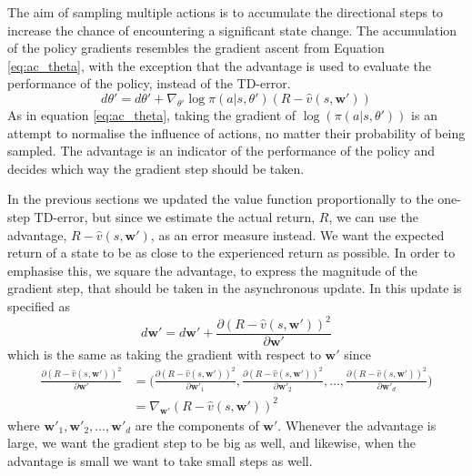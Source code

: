 \documentclass[11pt]{article}
\begin{document}
The aim of sampling multiple actions is to accumulate the directional steps
to increase the chance of encountering a significant state change.
The accumulation of the policy gradients resembles the gradient ascent from Equation
\ref{eq:ac_theta}, with the exception that the advantage is used to evaluate
the performance of the policy, instead of the TD-error.
\begin{equation}
    d\theta' = d\theta' + \nabla_{\theta'} \log \pi(a|s, \theta')(R - \hat{v}(s, \mathbf{w}'))
\end{equation}
As in equation \ref{eq:ac_theta}, taking the gradient of $\log(\pi(a|s, \theta'))$
is an attempt to normalise the influence of actions, no matter their probability
of being sampled.
The advantage is an indicator of the performance of the policy and decides
which way the gradient step should be taken.

In the previous sections we updated the value function proportionally to the
one-step TD-error, but since we estimate the actual return, $R$,
we can use the advantage, $R - \hat{v}(s, \mathbf{w'})$,
as an error measure instead.
We want the expected return of a state to be as close to the experienced return as possible.
In order to emphasise this, we square the advantage, to express the magnitude of the
gradient step, that should be taken in the asynchronous update.
In \cite{a3c} this update is specified as
\begin{equation}
    d\mathbf{w}' = d\mathbf{w}' + \frac{\partial (R - \hat{v}(s, \mathbf{w'}))^2}{\partial \mathbf{w}'}
\end{equation}
which is the same as taking the gradient with respect to $\mathbf{w}'$ since
\begin{equation*}
    \begin{aligned}
        \frac{\partial (R - \hat{v}(s, \mathbf{w}'))^2}{\partial \mathbf{w}'} & = \bigg(
            \frac{\partial (R - \hat{v}(s, \mathbf{w}'))^2}{\partial \mathbf{w}'_1},
            \frac{\partial (R - \hat{v}(s, \mathbf{w}'))^2}{\partial \mathbf{w}'_2}, \dots,
            \frac{\partial (R - \hat{v}(s, \mathbf{w}'))^2}{\partial \mathbf{w}'_d} \bigg) \\
            & = \nabla_{\mathbf{w}'} (R - \hat{v}(s, \mathbf{w}'))^2
    \end{aligned}
\end{equation*}
where $\mathbf{w}'_1, \mathbf{w}'_2, \dots, \mathbf{w}'_d$ are the components of $\mathbf{w}'$.
Whenever the advantage is large, we want the gradient step to be big as well,
and likewise, when the advantage is small we want to take small steps as well.
\end{document}
